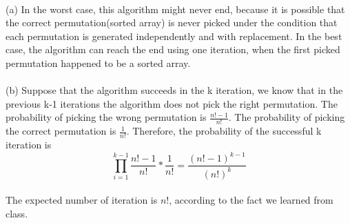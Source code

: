 \begin{problem}{2} ~\\
(a) In the worst case, this algorithm might never end, because it is possible that the correct permutation(sorted array) is never picked under the condition that each permutation is generated independently and with replacement. In the best case, the algorithm can reach the end using one iteration, when the first picked permutation happened to be a sorted array.\\
\\
(b) Suppose that the algorithm succeeds in the k iteration, we know that in the previous k-1 iterations the algorithm does not pick the right permutation. The probability of picking the wrong permutation is $\frac{n!-1}{n!}$. The probability of picking the correct permutation is $\frac{1}{n!}$. Therefore, the probability of the successful k iteration is $$\prod_{i=1}^{k-1} \frac{n!-1}{n!} * \frac{1}{n!} = \frac{(n!-1)^{k-1}}{(n!)^k}$$\\
The expected number of iteration is $n!$, according to the fact we learned from class.
\end{problem}